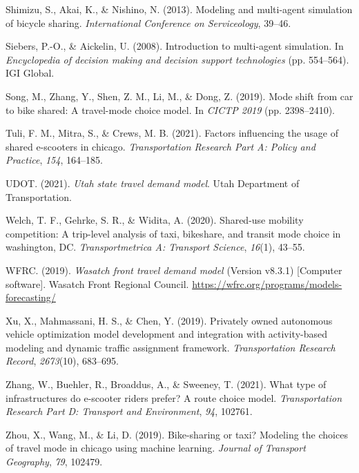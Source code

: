 \documentclass[fancy, masters]{byuthesis}
\newlength{\cslhangindent}
\newlength{\cslentryspacingunit} %
\newenvironment{CSLReferences}[2] %
 {%
  \setlength{\parindent}{0pt}
  \ifodd #1
  \let\oldpar\par
  \def\par{\hangindent=\cslhangindent\oldpar}
  \fi
  \setlength{\parskip}{#2\cslentryspacingunit}
 }%
 {}
\begin{document}
\begin{CSLReferences}{1}{0}
\leavevmode{}%
Shimizu, S., Akai, K., \& Nishino, N. (2013). Modeling and multi-agent simulation of bicycle sharing. \emph{International Conference on Serviceology}, 39--46.

\leavevmode{}%
Siebers, P.-O., \& Aickelin, U. (2008). Introduction to multi-agent simulation. In \emph{Encyclopedia of decision making and decision support technologies} (pp. 554--564). IGI Global.

\leavevmode{}%
Song, M., Zhang, Y., Shen, Z. M., Li, M., \& Dong, Z. (2019). Mode shift from car to bike shared: A travel-mode choice model. In \emph{CICTP 2019} (pp. 2398--2410).

\leavevmode{}%
Tuli, F. M., Mitra, S., \& Crews, M. B. (2021). Factors influencing the usage of shared e-scooters in chicago. \emph{Transportation Research Part A: Policy and Practice}, \emph{154}, 164--185.

\leavevmode{}%
UDOT. (2021). \emph{Utah state travel demand model}. Utah Department of Transportation.

\leavevmode{}%
Welch, T. F., Gehrke, S. R., \& Widita, A. (2020). Shared-use mobility competition: A trip-level analysis of taxi, bikeshare, and transit mode choice in washington, DC. \emph{Transportmetrica A: Transport Science}, \emph{16}(1), 43--55.

\leavevmode{}%
WFRC. (2019). \emph{Wasatch front travel demand model} (Version v8.3.1) {[}Computer software{]}. Wasatch Front Regional Council. \url{https://wfrc.org/programs/models-forecasting/}

\leavevmode{}%
Xu, X., Mahmassani, H. S., \& Chen, Y. (2019). Privately owned autonomous vehicle optimization model development and integration with activity-based modeling and dynamic traffic assignment framework. \emph{Transportation Research Record}, \emph{2673}(10), 683--695.

\leavevmode{}%
Zhang, W., Buehler, R., Broaddus, A., \& Sweeney, T. (2021). What type of infrastructures do e-scooter riders prefer? A route choice model. \emph{Transportation Research Part D: Transport and Environment}, \emph{94}, 102761.

\leavevmode{}%
Zhou, X., Wang, M., \& Li, D. (2019). Bike-sharing or taxi? Modeling the choices of travel mode in chicago using machine learning. \emph{Journal of Transport Geography}, \emph{79}, 102479.


\end{CSLReferences}
\end{document}
